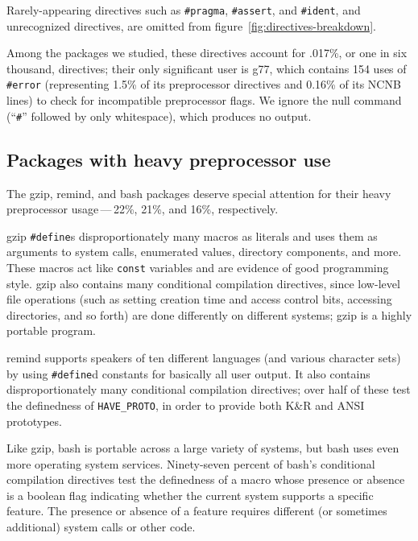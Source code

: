 \documentclass[10pt]{article}
\newcommand{\pkg}[1]{\textsf{#1}}
\begin{document}

Rarely-appearing directives such as {\tt \#pragma}, {\tt \#assert}, and
{\tt \#ident}, and unrecognized directives, are omitted from
figure~\ref{fig:directives-breakdown}.

Among the packages we studied, these directives account for .017\%, or one
in six thousand, directives; their only significant user is \pkg{g77},
which contains 154 uses of {\tt \#error} (representing 1.5\% of its
preprocessor directives and 0.16\% of its NCNB lines) to check for
incompatible preprocessor flags.  We ignore the null command (``{\tt \#}''
followed by only whitespace), which produces no output.


\subsection{Packages with heavy preprocessor use}

The \pkg{gzip}, \pkg{remind}, and \pkg{bash} packages deserve
special attention for their heavy preprocessor usage\,---\,22\%, 21\%, and
16\%, respectively.

\pkg{gzip} {\tt \#define}s disproportionately many macros as literals and
uses them as arguments to system calls, enumerated values, directory
components, and more.  These macros act like {\tt const} variables and are
evidence of good programming style.  \pkg{gzip} also contains many
conditional compilation directives, since low-level file operations (such
as setting creation time and access control bits, accessing directories,
and so forth) are done differently on different systems; \pkg{gzip} is a
highly portable program.

\pkg{remind} supports speakers of ten different languages (and various
character sets) by using {\tt \#define}d constants for basically all user
output.  It also contains disproportionately many conditional compilation
directives; over half of these test the definedness of \verb|HAVE_PROTO|,
in order to provide both K\&R and ANSI prototypes.

Like \pkg{gzip}, \pkg{bash} is portable across a large variety of
systems, but \pkg{bash} uses even more operating system services.
Ninety-seven percent of \pkg{bash}'s conditional compilation directives
test the definedness of a macro whose presence or absence is a boolean
flag indicating whether the current system supports a specific feature.
The presence or absence of a feature requires different (or sometimes
additional) system calls or other code.
\end{document}
